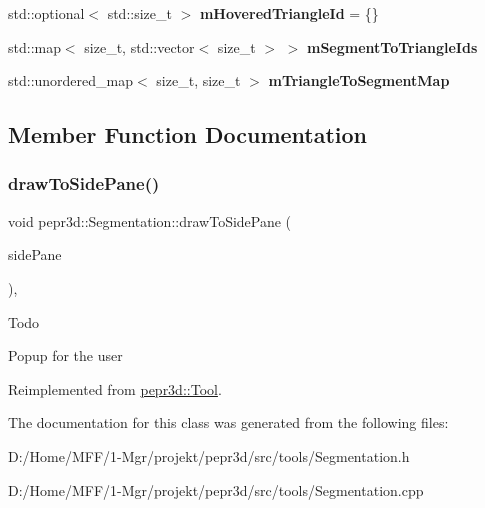 \begin{DoxyCompactItemize}
\mbox{\label{classpepr3d_1_1_segmentation_a6a213a470006808d715976b1d3ecf6de}} 
std\+::optional$<$ std\+::size\+\_\+t $>$ {\bfseries m\+Hovered\+Triangle\+Id} = \{\}
\item 
\mbox{\label{classpepr3d_1_1_segmentation_ad3344f323ffce78be2eaf73fca05be96}} 
std\+::map$<$ size\+\_\+t, std\+::vector$<$ size\+\_\+t $>$ $>$ {\bfseries m\+Segment\+To\+Triangle\+Ids}
\item 
\mbox{\label{classpepr3d_1_1_segmentation_a3282ce65f09dbdf09eac1e83bec117d6}} 
std\+::unordered\+\_\+map$<$ size\+\_\+t, size\+\_\+t $>$ {\bfseries m\+Triangle\+To\+Segment\+Map}
\end{DoxyCompactItemize}


\subsection{Member Function Documentation}
\mbox{\label{classpepr3d_1_1_segmentation_ac823ffa67827629012a45f3ac9a22c72}} 
\subsubsection{\texorpdfstring{drawToSidePane()}{drawToSidePane()}}
{\footnotesize\ttfamily void pepr3d\+::\+Segmentation\+::draw\+To\+Side\+Pane (\begin{DoxyParamCaption}\item[{\mbox{\hyperlink{classpepr3d_1_1_side_pane}{Side\+Pane}} \&}]{side\+Pane }\end{DoxyParamCaption})\hspace{0.3cm}{\ttfamily [override]}, {\ttfamily [virtual]}}

\begin{DoxyRefDesc}{Todo}
\item[\mbox{\hyperlink{todo__todo000001}{Todo}}]Popup for the user \end{DoxyRefDesc}


Reimplemented from \mbox{\hyperlink{classpepr3d_1_1_tool}{pepr3d\+::\+Tool}}.



The documentation for this class was generated from the following files\+:\begin{DoxyCompactItemize}
\item 
D\+:/\+Home/\+M\+F\+F/1-\/\+Mgr/projekt/pepr3d/src/tools/Segmentation.\+h\item 
D\+:/\+Home/\+M\+F\+F/1-\/\+Mgr/projekt/pepr3d/src/tools/Segmentation.\+cpp\end{DoxyCompactItemize}

